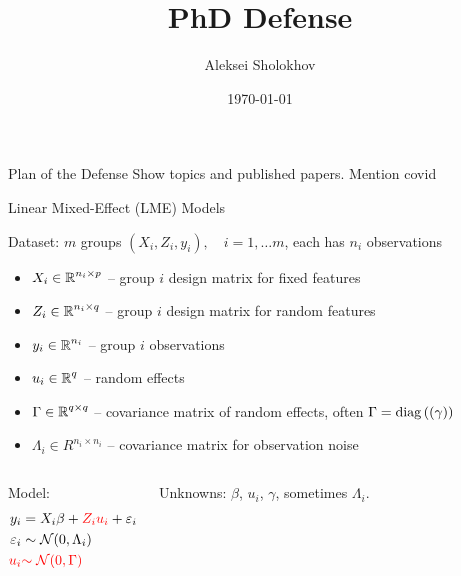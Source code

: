 \documentclass[8pt]{beamer}
\title{PhD Defense}
\date{\today}
\author{Aleksei Sholokhov}
\begin{document}
\maketitle

\begin{frame}{Plan of the Defense}
Show topics and published papers. Mention covid
\end{frame}


\begin{frame}{Linear Mixed-Effect (LME) Models}

	Dataset: $m$ groups $(X_i, Z_i, y_i),\quad i = 1, \dots m$, each has $n_i$ observations
	\begin{itemize}
		\item 	$X_i \in \operatorname{\mathbb{R}}^{n_i \times p}$ -- group $i$ design matrix for fixed features
		\item 	$Z_i \in \operatorname{\mathbb{R}}^{n_i \times q}$ -- group $i$ design matrix for random features
		\item 	$y_i \in \operatorname{\mathbb{R}}^{n_i}$ -- group $i$ observations  
		\item   $u_i \in \operatorname{\mathbb{R}}^q$ -- random effects
		\item   $\Gamma \in \operatorname{\mathbb{R}}^{q \times q}$ -- covariance matrix of random effects, often $\Gamma = \mathrm{diag}\left((\gamma)\right)$
		\item   $\Lambda_i \in R^{n_i \times n_i}$ -- covariance matrix for observation noise
	\end{itemize}
	

	\begin{columns}[T,onlytextwidth]
	
    \vspace{3em}
    Model:
	 	\[
   		\begin{split}
   			y_i & = X_i\beta + {\color{red}Z_i u_i} + \varepsilon_i \\
   			 \varepsilon_i & \sim \operatorname{\mathcal{N}}(0, \Lambda_i) \\
   			{\color{red} u_i} & {\color{red}\sim \operatorname{\mathcal{N}}(0, \Gamma)}
   		\end{split}
   		\]
   		   	
	Unknowns: $\beta$, $u_i$, $\gamma$, sometimes $\Lambda_i$.
	

\end{columns}
\end{frame}
\end{document}
